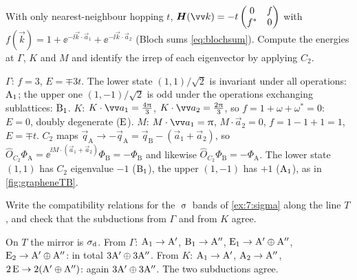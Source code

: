 \begin{exercise}\label{ex:7:NN}
With only nearest-neighbour hopping $t$, $\mat{H}(\vec{k})=-t\begin{pmatrix}0&f\\f^{*}&0\end{pmatrix}$
with $f(\vec{k})=1+\ee^{-\ii\vec{k}\cdot\vec{a}_1}+\ee^{-\ii\vec{k}\cdot\vec{a}_2}$ (Bloch sums
\eqref{eq:blochsum}). Compute the energies at $\Gamma$, $K$ and $M$ and identify the
irrep of each eigenvector by applying $C_2$.
\end{exercise}

\begin{solution}
$\Gamma$: $f=3$, $E=\mp3t$. The lower state $(1,1)/\sqrt2$ is invariant under all
operations: $\mathrm{A}_1$; the upper one $(1,-1)/\sqrt2$ is odd under the operations
exchanging sublattices: $\mathrm{B}_1$.
$K$: $K\cdot\vec{a}_1=\tfrac{4\cpi}{3}$, $K\cdot\vec{a}_2=\tfrac{2\cpi}{3}$, so
$f=1+\omega+\omega^{*}=0$: $E=0$, doubly degenerate ($\mathrm{E}$).
$M$: $M\cdot\vec{a}_1=\cpi$, $M\cdot\vec{a}_2=0$, $f=1-1+1=1$, $E=\mp t$. $C_2$ maps
$\vec{q}_{\mathrm{A}}\to-\vec{q}_{\mathrm{A}}=\vec{q}_{\mathrm{B}}-(\vec{a}_1+\vec{a}_2)$, so
$\hat{O}_{C_2}\Phi_{\mathrm{A}}=\ee^{\ii M\cdot(\vec{a}_1+\vec{a}_2)}\Phi_{\mathrm{B}}=-\Phi_{\mathrm{B}}$ and
likewise $\hat{O}_{C_2}\Phi_{\mathrm{B}}=-\Phi_{\mathrm{A}}$. The lower state $(1,1)$ has $C_2$
eigenvalue $-1$ ($\mathrm{B}_1$), the upper $(1,-1)$ has $+1$ ($\mathrm{A}_1$), as in
\cref{fig:grapheneTB}.
\end{solution}

\begin{exercise}\label{ex:7:compat}
Write the compatibility relations for the $\upsigma$ bands of \cref{ex:7:sigma} along
the line $T$, and check that the subductions from $\Gamma$ and from $K$ agree.
\end{exercise}

\begin{solution}
On $T$ the mirror is $\sigma_{\mathrm{d}}$. From $\Gamma$: $\mathrm{A}_1\to\mathrm{A}'$, $\mathrm{B}_1\to\mathrm{A}''$,
$\mathrm{E}_1\to\mathrm{A}'\oplus\mathrm{A}''$, $\mathrm{E}_2\to\mathrm{A}'\oplus\mathrm{A}''$: in total
$3\mathrm{A}'\oplus3\mathrm{A}''$. From $K$: $\mathrm{A}_1\to\mathrm{A}'$, $\mathrm{A}_2\to\mathrm{A}''$,
$2\,\mathrm{E}\to2(\mathrm{A}'\oplus\mathrm{A}'')$: again $3\mathrm{A}'\oplus3\mathrm{A}''$. The two subductions
agree.
\end{solution}
